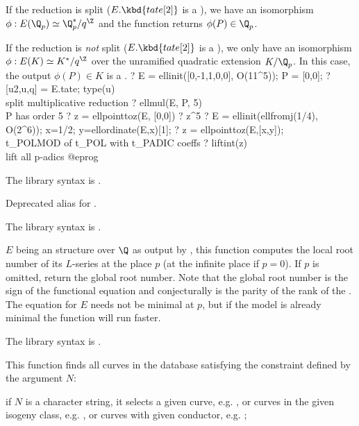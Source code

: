 \item If the reduction is split ($E.\kbd{tate[2]}$ is a ), we have
an isomorphism $\phi: E(\Q_p) \simeq \Q_p^*/q^\Z$ and the function returns
$\phi(P)\in \Q_p$.

\item If the reduction is \emph{not} split ($E.\kbd{tate[2]}$ is a
), we only have an isomorphism $\phi: E(K) \simeq K^*/q^\Z$ over
the unramified quadratic extension $K/\Q_p$. In this case, the output
$\phi(P)\in K$ is a .
\bprog
? E = ellinit([0,-1,1,0,0], O(11^5)); P = [0,0];
? [u2,u,q] = E.tate; type(u) \\ split multiplicative reduction
? ellmul(E, P, 5)  \\ P has order 5
? z = ellpointtoz(E, [0,0])
? z^5
? E = ellinit(ellfromj(1/4), O(2^6)); x=1/2; y=ellordinate(E,x)[1];
? z = ellpointtoz(E,[x,y]); \\ t_POLMOD of t_POL with t_PADIC coeffs
? liftint(z) \\ lift all p-adics
@eprog

The library syntax is .

\label{se:ellpow}
Deprecated alias for .

The library syntax is .

\label{se:ellrootno}
$E$ being an  structure over $\Q$ as output by ,
this function computes the local root number of its $L$-series at the place
$p$ (at the infinite place if $p = 0$). If $p$ is omitted, return the global
root number. Note that the global root number is the sign of the functional
equation and conjecturally is the parity of the rank of the . The equation for $E$ needs not be minimal at $p$, but if the model
is already minimal the function will run faster.

The library syntax is .

\label{se:ellsearch}
This function finds all curves in the  database satisfying
the constraint defined by the argument $N$:

\item if $N$ is a character string, it selects a given curve, e.g.
, or curves in the given isogeny class, e.g. , or
curves with given conductor, e.g. ;

